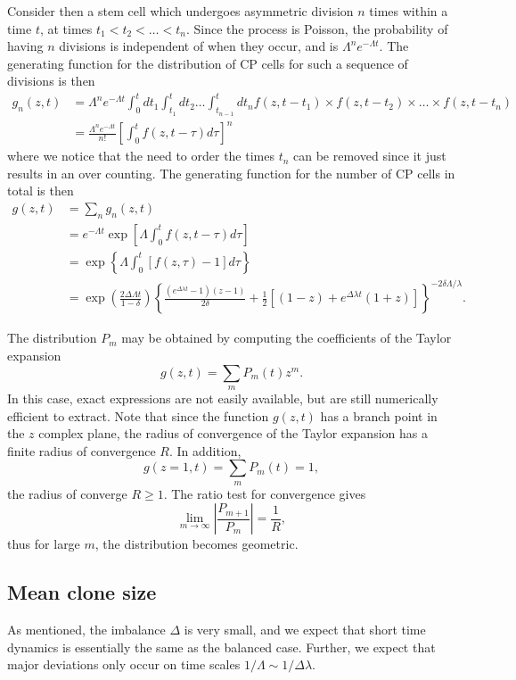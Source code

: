 \documentclass[10pt,UKenglish]{article}
\begin{document}
Consider then a stem cell which undergoes asymmetric division $n$ times within a time $t$, at times $t_1 < t_2 < \ldots < t_n$. Since the process is Poisson, the probability of having $n$ divisions is independent of when they occur, and is $\Lambda^n e^{-\Lambda t}$. The generating function for the distribution of CP cells for such a sequence of divisions is then
\begin{align*}
g_n(z,t) &= \Lambda^n e^{-\Lambda t} \int_0^t dt_1 \int_{t_1}^t dt_2 \ldots \int_{t_{n-1}}^t dt_n f(z,t-t_1) \times f(z,t-t_2) \times \ldots \times f(z,t-t_n) \\
 &= \frac{\Lambda^n e^{-\Lambda t}}{n!} \left[\int_0^t f(z,t-\tau) d\tau \right]^n
\end{align*}
where we notice that the need to order the times $t_n$ can be removed since it just results in an over counting. The generating function for the number of CP cells in total is then
\begin{align*}
g(z,t) &= \sum_n g_n(z,t) \\
 &= e^{-\Lambda t} \exp\left[\Lambda \int_0^t f(z,t-\tau) d\tau \right] \\
 &= \exp\left\{\Lambda \int_0^t \left[f(z,\tau) - 1\right] d\tau \right\} \\
 &= \exp\left(\frac{2 \Delta \Lambda t}{1-\delta}\right) \left\{ \frac{\left(e^{\Delta \lambda t}-1 \right)(z-1)}{2\delta} + \frac{1}{2}\left[(1-z) + e^{\Delta \lambda t}(1+z) \right]\right\}^{-2\delta\Lambda/\lambda}.
\end{align*}

The distribution $P_m$ may be obtained by computing the coefficients of the Taylor expansion $$g(z,t) = \sum_m P_m(t) z^m.$$ In this case, exact expressions are not easily available, but are still numerically efficient to extract. Note that since the function $g(z,t)$ has a branch point in the $z$ complex plane, the radius of convergence of the Taylor expansion has a finite radius of convergence $R$. In addition, $$g(z=1,t) = \sum_m P_m(t) = 1,$$ the radius of converge $R \ge 1$. The ratio test for convergence gives $$\lim_{m\rightarrow \infty} \left| \frac{P_{m+1}}{P_m} \right| = \frac{1}{R},$$ thus for large $m$, the distribution becomes geometric.

\subsection{Mean clone size}

As mentioned, the imbalance $\Delta$ is very small, and we expect that short time dynamics is essentially the same as the balanced case. Further, we expect that major deviations only occur on time scales $1/\Lambda \sim 1/\Delta \lambda$.
\end{document}
